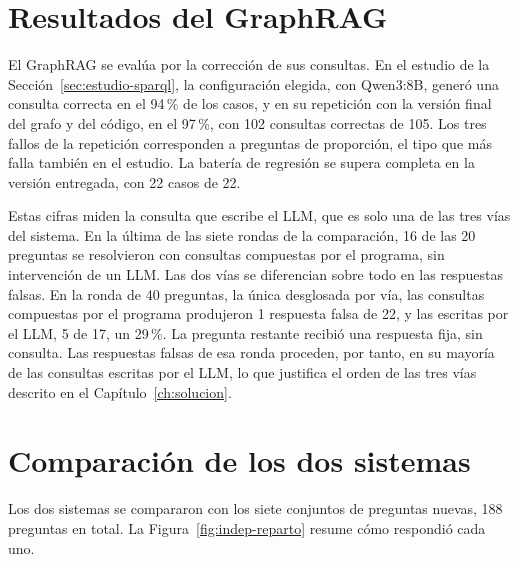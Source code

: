 \documentclass[11pt, a4paper]{report}
\begin{document}
	\section{Resultados del GraphRAG}
	\label{sec:resultados-graphrag}

	El GraphRAG se evalúa por la corrección de sus consultas. En el estudio de la
	Sección~\ref{sec:estudio-sparql}, la configuración elegida, con Qwen3:8B,
	generó una consulta correcta en el 94\,\% de los casos, y en su repetición con
	la versión final del grafo y del código, en el 97\,\%, con 102 consultas
	correctas de 105. Los tres fallos de la repetición corresponden a preguntas de
	proporción, el tipo que más falla también en el estudio. La batería
	de regresión se supera completa en la versión entregada, con 22 casos de 22.

	Estas cifras miden la consulta que escribe el LLM, que es solo una de las tres
	vías del sistema. En la última de las siete rondas de la comparación, 16 de las 20
	preguntas se resolvieron con consultas compuestas por el programa, sin intervención de un LLM. Las dos vías se diferencian sobre todo en las
	respuestas falsas. En la ronda de 40 preguntas, la única desglosada por
	vía, las consultas compuestas por el programa produjeron 1
	respuesta falsa de 22, y las escritas por el LLM, 5 de 17, un 29\,\%. La
	pregunta restante recibió una respuesta fija, sin consulta. Las respuestas
	falsas de esa ronda proceden, por tanto, en su mayoría de las consultas escritas por el LLM, lo que justifica el orden de las tres vías descrito en el
	Capítulo~\ref{ch:solucion}.

	\section{Comparación de los dos sistemas}
	\label{sec:resultados-independiente}

	Los dos sistemas se compararon con los siete conjuntos de preguntas nuevas,
	188 preguntas en total. La Figura~\ref{fig:indep-reparto} resume cómo
	respondió cada uno.
\end{document}

